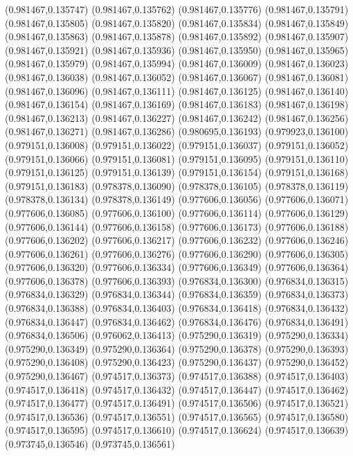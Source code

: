 (0.981467,0.135747)
(0.981467,0.135762)
(0.981467,0.135776)
(0.981467,0.135791)
(0.981467,0.135805)
(0.981467,0.135820)
(0.981467,0.135834)
(0.981467,0.135849)
(0.981467,0.135863)
(0.981467,0.135878)
(0.981467,0.135892)
(0.981467,0.135907)
(0.981467,0.135921)
(0.981467,0.135936)
(0.981467,0.135950)
(0.981467,0.135965)
(0.981467,0.135979)
(0.981467,0.135994)
(0.981467,0.136009)
(0.981467,0.136023)
(0.981467,0.136038)
(0.981467,0.136052)
(0.981467,0.136067)
(0.981467,0.136081)
(0.981467,0.136096)
(0.981467,0.136111)
(0.981467,0.136125)
(0.981467,0.136140)
(0.981467,0.136154)
(0.981467,0.136169)
(0.981467,0.136183)
(0.981467,0.136198)
(0.981467,0.136213)
(0.981467,0.136227)
(0.981467,0.136242)
(0.981467,0.136256)
(0.981467,0.136271)
(0.981467,0.136286)
(0.980695,0.136193)
(0.979923,0.136100)
(0.979151,0.136008)
(0.979151,0.136022)
(0.979151,0.136037)
(0.979151,0.136052)
(0.979151,0.136066)
(0.979151,0.136081)
(0.979151,0.136095)
(0.979151,0.136110)
(0.979151,0.136125)
(0.979151,0.136139)
(0.979151,0.136154)
(0.979151,0.136168)
(0.979151,0.136183)
(0.978378,0.136090)
(0.978378,0.136105)
(0.978378,0.136119)
(0.978378,0.136134)
(0.978378,0.136149)
(0.977606,0.136056)
(0.977606,0.136071)
(0.977606,0.136085)
(0.977606,0.136100)
(0.977606,0.136114)
(0.977606,0.136129)
(0.977606,0.136144)
(0.977606,0.136158)
(0.977606,0.136173)
(0.977606,0.136188)
(0.977606,0.136202)
(0.977606,0.136217)
(0.977606,0.136232)
(0.977606,0.136246)
(0.977606,0.136261)
(0.977606,0.136276)
(0.977606,0.136290)
(0.977606,0.136305)
(0.977606,0.136320)
(0.977606,0.136334)
(0.977606,0.136349)
(0.977606,0.136364)
(0.977606,0.136378)
(0.977606,0.136393)
(0.976834,0.136300)
(0.976834,0.136315)
(0.976834,0.136329)
(0.976834,0.136344)
(0.976834,0.136359)
(0.976834,0.136373)
(0.976834,0.136388)
(0.976834,0.136403)
(0.976834,0.136418)
(0.976834,0.136432)
(0.976834,0.136447)
(0.976834,0.136462)
(0.976834,0.136476)
(0.976834,0.136491)
(0.976834,0.136506)
(0.976062,0.136413)
(0.975290,0.136319)
(0.975290,0.136334)
(0.975290,0.136349)
(0.975290,0.136364)
(0.975290,0.136378)
(0.975290,0.136393)
(0.975290,0.136408)
(0.975290,0.136423)
(0.975290,0.136437)
(0.975290,0.136452)
(0.975290,0.136467)
(0.974517,0.136373)
(0.974517,0.136388)
(0.974517,0.136403)
(0.974517,0.136418)
(0.974517,0.136432)
(0.974517,0.136447)
(0.974517,0.136462)
(0.974517,0.136477)
(0.974517,0.136491)
(0.974517,0.136506)
(0.974517,0.136521)
(0.974517,0.136536)
(0.974517,0.136551)
(0.974517,0.136565)
(0.974517,0.136580)
(0.974517,0.136595)
(0.974517,0.136610)
(0.974517,0.136624)
(0.974517,0.136639)
(0.973745,0.136546)
(0.973745,0.136561)
